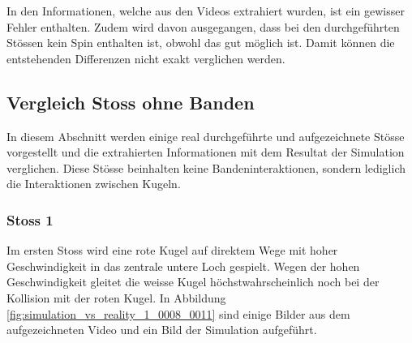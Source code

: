 In den Informationen, welche aus den Videos extrahiert wurden, ist ein gewisser Fehler enthalten.
Zudem wird davon ausgegangen, dass bei den durchgeführten Stössen kein Spin enthalten ist, obwohl das gut möglich ist.
Damit können die entstehenden Differenzen nicht exakt verglichen werden.

\newpage
\subsection{Vergleich Stoss ohne Banden}
In diesem Abschnitt werden einige real durchgeführte und aufgezeichnete Stösse vorgestellt und die extrahierten Informationen mit
dem Resultat der Simulation verglichen.
Diese Stösse beinhalten keine Bandeninteraktionen, sondern lediglich die Interaktionen zwischen Kugeln.

\subsubsection{Stoss 1}
Im ersten Stoss wird eine rote Kugel auf direktem Wege mit hoher Geschwindigkeit in das zentrale untere Loch gespielt.
Wegen der hohen Geschwindigkeit gleitet die weisse Kugel höchstwahrscheinlich noch bei der Kollision mit der roten Kugel.
In Abbildung \ref{fig:simulation_vs_reality_1_0008_0011} sind einige Bilder aus dem aufgezeichneten Video und ein Bild
der Simulation aufgeführt.

